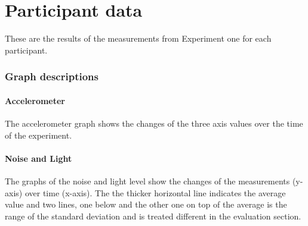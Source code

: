 \chapter{Participant data}

These are the results of the measurements from Experiment one for each participant. 

\subsection{Graph descriptions}

\subsubsection{Accelerometer}
The accelerometer graph shows the changes of the three axis values over the time of the experiment. 

\subsubsection{Noise and Light}
The graphs of the noise and light level show the changes of the measurements (y-axis) over time (x-axis). 
The the thicker horizontal line indicates the average value and two lines, one below and the other one on top of the average is the range of the standard deviation and is treated different in the evaluation section.

\clearpage

\clearpage

\clearpage

\clearpage

\clearpage
